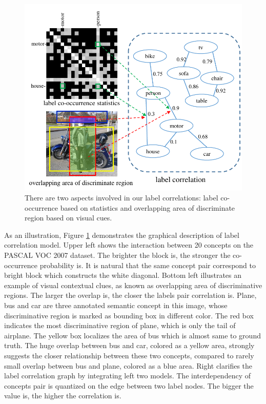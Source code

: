 \begin{figure}[t]
    \begin{center}
        \includegraphics[width=1\linewidth]{fig_correlations.pdf}
    \end{center}
    \caption{There are two aspects involved in our label correlations: label co-occurrence based on statistics and overlapping area of discriminate region based on visual cues.}
    \label{fig:correlations}
\end{figure}

As an illustration, Figure \ref{fig:correlations} demonstrates the graphical description of label correlation model. Upper left shows the interaction between 20 concepts on the PASCAL VOC 2007 dataset. The brighter the block is, the stronger the co-occurrence probability is. It is natural that the same concept pair correspond to bright block which constructs the white diagonal. Bottom left illustrates an example of visual contextual clues, as known as overlapping area of discriminative regions. The larger the overlap is, the closer the labels pair correlation is. Plane, bus and car are three annotated semantic concept in this image, whose discriminative region is marked as bounding box in different color. The red box indicates the most discriminative region of plane, which is only the tail of airplane. The yellow box localizes the area of bus which is almost same to ground truth. The huge overlap between bus and car, colored as a yellow area, strongly suggests the closer relationship between these two concepts, compared to rarely small overlap between bus and plane, colored as a blue area. Right clarifies the label correlation graph by integrating left two models. The interdependency of concepts pair is quantized on the edge between two label nodes. The bigger the value is, the higher the correlation is.

